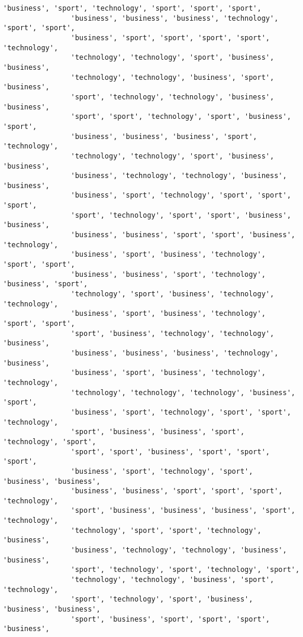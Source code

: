 \documentclass[11pt]{article}
\begin{document}
\begin{Verbatim}[commandchars=\\\{\}]
                'business', 'sport', 'technology', 'sport', 'sport', 'sport',
                'business', 'business', 'business', 'technology', 'sport', 'sport',
                'business', 'sport', 'sport', 'sport', 'sport', 'technology',
                'technology', 'technology', 'sport', 'business', 'business',
                'technology', 'technology', 'business', 'sport', 'business',
                'sport', 'technology', 'technology', 'business', 'business',
                'sport', 'sport', 'technology', 'sport', 'business', 'sport',
                'business', 'business', 'business', 'sport', 'technology',
                'technology', 'technology', 'sport', 'business', 'business',
                'business', 'technology', 'technology', 'business', 'business',
                'business', 'sport', 'technology', 'sport', 'sport', 'sport',
                'sport', 'technology', 'sport', 'sport', 'business', 'business',
                'business', 'business', 'sport', 'sport', 'business', 'technology',
                'business', 'sport', 'business', 'technology', 'sport', 'sport',
                'business', 'business', 'sport', 'technology', 'business', 'sport',
                'technology', 'sport', 'business', 'technology', 'technology',
                'business', 'sport', 'business', 'technology', 'sport', 'sport',
                'sport', 'business', 'technology', 'technology', 'business',
                'business', 'business', 'business', 'technology', 'business',
                'business', 'sport', 'business', 'technology', 'technology',
                'technology', 'technology', 'technology', 'business', 'sport',
                'business', 'sport', 'technology', 'sport', 'sport', 'technology',
                'sport', 'business', 'business', 'sport', 'technology', 'sport',
                'sport', 'sport', 'business', 'sport', 'sport', 'sport',
                'business', 'sport', 'technology', 'sport', 'business', 'business',
                'business', 'business', 'sport', 'sport', 'sport', 'technology',
                'sport', 'business', 'business', 'business', 'sport', 'technology',
                'technology', 'sport', 'sport', 'technology', 'business',
                'business', 'technology', 'technology', 'business', 'business',
                'sport', 'technology', 'sport', 'technology', 'sport',
                'technology', 'technology', 'business', 'sport', 'technology',
                'sport', 'technology', 'sport', 'business', 'business', 'business',
                'sport', 'business', 'sport', 'sport', 'sport', 'business',

\end{Verbatim}
\end{document}
